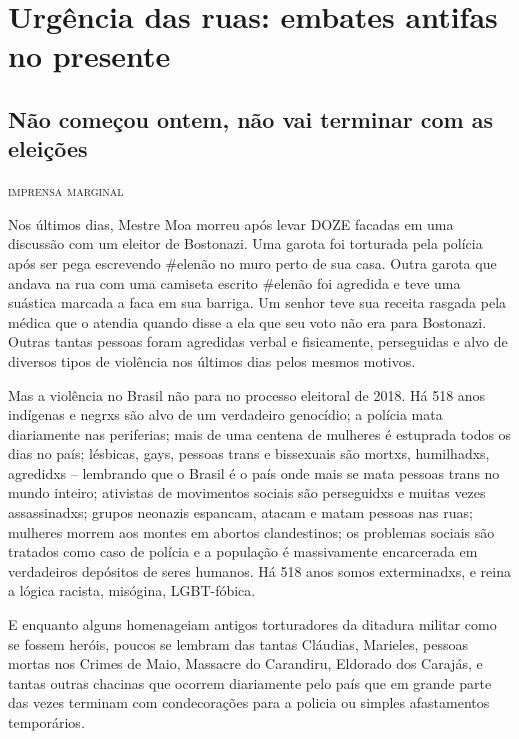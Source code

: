 \part{Urgência das ruas: embates antifas no presente}

\chapter{Não começou ontem, não vai terminar com as eleições}

\hfill{}\textsc{imprensa marginal}

\bigskip

Nos últimos dias, Mestre Moa morreu após levar DOZE facadas em uma discussão com um eleitor de Bostonazi. Uma garota foi torturada pela polícia após ser pega escrevendo \#elenão no muro perto de sua casa. Outra garota que andava na rua com uma camiseta escrito \#elenão foi agredida e teve uma suástica marcada a faca em sua barriga. Um senhor teve sua receita rasgada pela médica que o atendia quando disse a ela que seu voto não era para Bostonazi. Outras tantas pessoas foram agredidas verbal e fisicamente, perseguidas e alvo de diversos tipos de violência nos últimos dias pelos mesmos motivos.

Mas a violência no Brasil não para no processo eleitoral de 2018. Há 518 anos indígenas e negrxs são alvo de um verdadeiro genocídio; a polícia mata diariamente nas periferias; mais de uma centena de mulheres é estuprada todos os dias no país; lésbicas, gays, pessoas trans e bissexuais são mortxs, humilhadxs, agredidxs – lembrando que o Brasil é o país onde mais se mata pessoas trans no mundo inteiro; ativistas de movimentos sociais são perseguidxs e muitas vezes assassinadxs; grupos neonazis espancam, atacam e matam pessoas nas ruas; mulheres morrem aos montes em abortos clandestinos; os problemas sociais são tratados como caso de polícia e a população é massivamente encarcerada em verdadeiros depósitos de seres humanos. Há 518 anos somos exterminadxs, e reina a lógica racista, misógina, LGBT-fóbica.

E enquanto alguns homenageiam antigos torturadores da ditadura militar como se fossem heróis, poucos se lembram das tantas Cláudias, Marieles, pessoas mortas nos Crimes de Maio, Massacre do Carandiru, Eldorado dos Carajás, e tantas outras chacinas que ocorrem diariamente pelo país que em grande parte das vezes terminam com condecorações para a policia ou simples afastamentos temporários.

